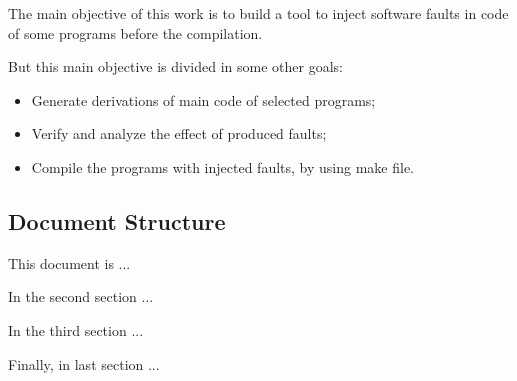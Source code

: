 The main objective of this work is to build a tool to inject software faults in code of some programs before the compilation.

But this main objective is divided in some other goals:

\begin{itemize}
	\item Generate derivations of main code of selected programs;
	\item Verify and analyze the effect of produced faults;
	\item Compile the programs with injected faults, by using make file.
\end{itemize}



\subsection{Document Structure}

This document is ...

In the second section ...

In the third section ...

Finally, in last section ...
